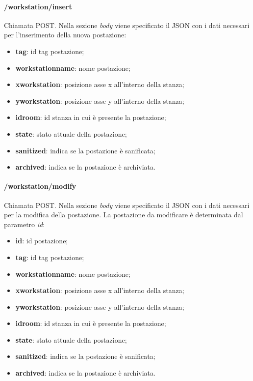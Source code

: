 \paragraph{/workstation/insert}
Chiamata POST. Nella sezione \textit{body} viene specificato il JSON con i dati necessari per l'inserimento della nuova postazione:
\begin{itemize}
	\item \textbf{tag}: id tag postazione;
	\item \textbf{workstationname}: nome postazione;
	\item \textbf{xworkstation}: posizione asse x all'interno della stanza;
	\item \textbf{yworkstation}: posizione asse y all'interno della stanza;	
	\item \textbf{idroom}: id stanza in cui è presente la postazione;	
	\item \textbf{state}: stato attuale della postazione;	
	\item \textbf{sanitized}: indica se la postazione è sanificata;	
	\item \textbf{archived}: indica se la postazione è archiviata.	
\end{itemize}
\paragraph{/workstation/modify}
Chiamata POST. Nella sezione \textit{body} viene specificato il JSON con i dati necessari per la modifica della postazione. La postazione da modificare è determinata dal parametro \textit{id}:
\begin{itemize}
	\item \textbf{id}: id postazione;
	\item \textbf{tag}: id tag postazione;
	\item \textbf{workstationname}: nome postazione;
	\item \textbf{xworkstation}: posizione asse x all'interno della stanza;
	\item \textbf{yworkstation}: posizione asse y all'interno della stanza;	
	\item \textbf{idroom}: id stanza in cui è presente la postazione;	
	\item \textbf{state}: stato attuale della postazione;	
	\item \textbf{sanitized}: indica se la postazione è sanificata;	
	\item \textbf{archived}: indica se la postazione è archiviata.	
\end{itemize}
